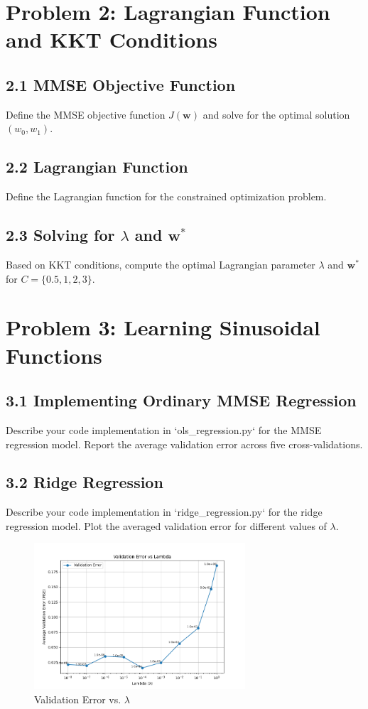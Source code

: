 \documentclass[12pt]{article}
\begin{document}
\section*{Problem 2: Lagrangian Function and KKT Conditions}

\subsection*{2.1 MMSE Objective Function}
Define the MMSE objective function \( J(\mathbf{w}) \) and solve for the optimal solution \( (w_0, w_1) \).

\subsection*{2.2 Lagrangian Function}
Define the Lagrangian function for the constrained optimization problem.

\subsection*{2.3 Solving for \( \lambda \) and \( \mathbf{w}^* \)}
Based on KKT conditions, compute the optimal Lagrangian parameter \( \lambda \) and \( \mathbf{w}^* \) for \( C = \{0.5, 1, 2, 3\} \).

\section*{Problem 3: Learning Sinusoidal Functions}

\subsection*{3.1 Implementing Ordinary MMSE Regression}
Describe your code implementation in `ols\_regression.py` for the MMSE regression model. Report the average validation error across five cross-validations.

\subsection*{3.2 Ridge Regression}
Describe your code implementation in `ridge\_regression.py` for the ridge regression model. Plot the averaged validation error for different values of \( \lambda \).

\begin{figure}[H]
    \centering
    \includegraphics[width=0.7\textwidth]{ridge_regression_plot.png}
    \caption{Validation Error vs. \( \lambda \)}
\end{figure}
\end{document}
